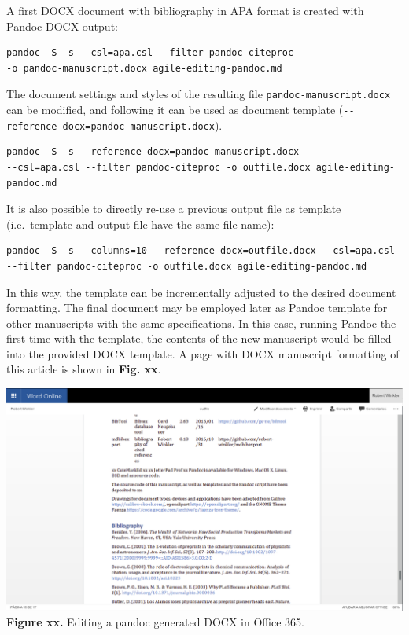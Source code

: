 \documentclass[10pt,fleqn]{wlpeerj}
\begin{document}
A
first
DOCX
document
with
bibliography
in
APA
format
is
created
with
Pandoc
DOCX
output:

\begin{verbatim}
pandoc -S -s --csl=apa.csl --filter pandoc-citeproc
-o pandoc-manuscript.docx agile-editing-pandoc.md
\end{verbatim}

The
document
settings
and
styles
of
the
resulting
file
\texttt{pandoc-manuscript.docx}
can
be
modified,
and
following
it
can
be
used
as
document
template
(\texttt{-\/-reference-docx=pandoc-manuscript.docx}).

\begin{verbatim}
pandoc -S -s --reference-docx=pandoc-manuscript.docx
--csl=apa.csl --filter pandoc-citeproc -o outfile.docx agile-editing-pandoc.md
\end{verbatim}

It is
also
possible
to
directly
re-use
a
previous
output
file
as
template
(i.e.~template
and
output
file
have
the
same
file
name):

\begin{verbatim}
pandoc -S -s --columns=10 --reference-docx=outfile.docx --csl=apa.csl --filter pandoc-citeproc -o outfile.docx agile-editing-pandoc.md
\end{verbatim}

In
this
way,
the
template
can
be
incrementally
adjusted
to
the
desired
document
formatting.
The
final
document
may
be
employed
later
as
Pandoc
template
for
other
manuscripts
with
the
same
specifications.
In
this
case,
running
Pandoc
the
first
time
with
the
template,
the
contents
of
the
new
manuscript
would
be
filled
into
the
provided
DOCX
template.
A
page
with
DOCX
manuscript
formatting
of
this
article
is
shown
in
\textbf{Fig.
xx}.

\includegraphics{fig-DOCX-document-in-O365.png}
\textbf{Figure
xx.}
Editing
a
pandoc
generated
DOCX
in
Office
365.
\end{document}
